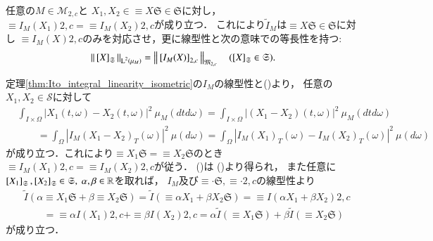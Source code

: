 	\begin{screen}
		\begin{thm}
			任意の$M \in \mathcal{M}_{2,c}$と
			$X_1,X_2 \in \equiv{X}{\mathfrak{S}} \in \mathfrak{S}$に対し，
			$\equiv{I_M(X_1)}{2,c} = \equiv{I_M(X_2)}{2,c}$が成り立つ．
			これにより$\tilde{I}_M$は$\equiv{X}{\mathfrak{S}} \in \mathfrak{S}$に対し
			$\equiv{I_M(X)}{2,c}$のみを対応させ，更に線型性と次の意味での等長性を持つ:
			\begin{align}
				\left\|\, \left[X\right]_{\mathfrak{S}}\, \right\|_{\operatorname{L}^{2} \left(\mu_M\right)} = \left\|\, \left[I_M(X)\right]_{2,c}\, \right\|_{\mathfrak{M}_{2,c}}
				\quad (\left[X\right]_{\mathfrak{S}} \in \mathfrak{S}).
				\label{eq:thm_Ito_integral_equiv_class_linearity_isometric}
			\end{align}
			\label{thm:Ito_integral_equiv_class_linearity_isometric}
		\end{thm}
	\end{screen}
	
	\begin{prf}
		定理\ref{thm:Ito_integral_linearity_isometric}の$I_M$の線型性と()より，
		任意の$X_1,X_2 \in \mathcal{S}$に対して
		\begin{align}
			&\int_{I \times \Omega} \left| X_1(t,\omega) - X_2(t,\omega) \right|^2\ \mu_M(dtd\omega)
			= \int_{I \times \Omega} \left| (X_1 - X_2)(t,\omega) \right|^2\ \mu_M(dtd\omega) \\
			&\qquad = \int_\Omega \left| I_M(X_1 - X_2)_T(\omega) \right|^2\ \mu(d\omega)
			= \int_\Omega \left| I_M(X_1)_T(\omega) - I_M(X_2)_T(\omega) \right|^2\ \mu(d\omega)
		\end{align}
		が成り立つ．これにより$\equiv{X_1}{\mathfrak{S}} = \equiv{X_2}{\mathfrak{S}}$のとき
		$\equiv{I_M(X_1)}{2,c} = \equiv{I_M(X_2)}{2,c}$が従う．
		()は
		()より得られ，
		また任意に$\left[X_1\right]_{\mathfrak{S}},\left[X_2\right]_{\mathfrak{S}} \in \mathfrak{S},\ \alpha,\beta \in \mathbb{R}$を取れば，
		$I_M$及び$\equiv{\cdot}{\mathfrak{S}},\equiv{\cdot}{2,c}$の線型性より
		\begin{align}
			&\tilde{I}\left( \alpha \equiv{X_1}{\mathfrak{S}} + \beta \equiv{X_2}{\mathfrak{S}} \right)
			= \tilde{I}\left( \equiv{\alpha X_1 + \beta X_2}{\mathfrak{S}} \right)
			= \equiv{I(\alpha X_1 + \beta X_2)}{2,c} \\
			&\qquad = \equiv{\alpha I(X_1)}{2,c} + \equiv{\beta I(X_2)}{2,c}
			= \alpha \tilde{I}\left( \equiv{X_1}{\mathfrak{S}} \right) + \beta \tilde{I}\left( \equiv{X_2}{\mathfrak{S}} \right)
		\end{align}
		が成り立つ．
	\end{prf}
	
